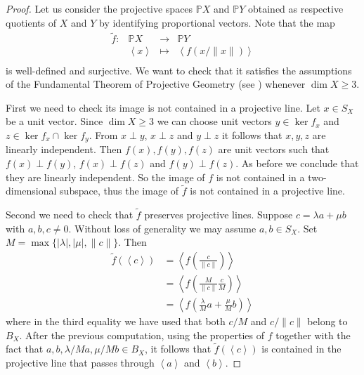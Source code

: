 \documentclass{memo-l}
\theoremstyle{definition}
\theoremstyle{remark}
\numberwithin{section}{chapter}
\numberwithin{equation}{chapter}
\begin{document}
\begin{proof}
    Let us consider the projective spaces $\mathbb{P}X$ and $\mathbb{P}Y$ obtained as respective quotients of $X$ and $Y$ by identifying proportional vectors. Note that the map
    \[
    \begin{array}{cccc}
    \tilde f\colon& \mathbb{P}X & \longrightarrow & \mathbb{P}Y \\
            & \left< x \right> & \longmapsto & \left< f(x/\|x\|) \right> \\
    \end{array}
    \]
    is well-defined and surjective. We want to check that it satisfies
    the assumptions of the Fundamental Theorem of Projective Geometry
    (see \cite[Theorem 2.1]{ilisevic_turnesk2020}) whenever $\dim X\ge 3$.

    First we need to check its image is not contained in a projective
    line. Let $x \in S_X$ be a unit vector. Since $\dim X\ge 3$ we can
    choose unit vectors $y \in \ker f_x$ and $z \in \ker f_x \cap \ker
    f_y$. From $x\perp y$, $x\perp z$ and $y\perp z$ it follows that
    $x,y,z$ are linearly independent. Then $f(x),f(y),f(z)$ are
    unit vectors such that $f(x)\perp f(y)$, $f(x)\perp f(z)$ and
    $f(y)\perp f(z)$. As before we conclude that they are linearly
    independent. So the image of $f$ is not contained in a
    two-dimensional subspace, thus the image of $\tilde f$ is not
    contained in a projective line.

    Second we need to check that $\tilde f$ preserves projective
    lines. Suppose $c=\lambda a+\mu b$ with $a,b,c \neq 0$. Without
    loss of generality we may assume $a,b \in S_X$. Set
    $M=\max\{|\lambda |, |\mu |, \|c\|\}$. Then
    \begin{align*}
        \tilde f(\left< c \right>)&=\left< f(\frac{c}{\|c\|}) \right>\\
                                  &=\left<
                                  f(\frac{M}{\|c\|}\frac{c}{M})
                                  \right>\\
                                  &=\left< f(\frac{\lambda
                                  }{M}a+\frac{\mu }{M}b)\right>
    \end{align*}
    where in the third equality we have used that both $c/M$ and
    $c/\|c\|$ belong to $B_X$. After the previous computation, using
    the properties of $f$ together with the fact that $a,b, \lambda
    /Ma, \mu /Mb \in B_X$, it follows that $\tilde f(\left< c
    \right>)$ is contained in the projective line that passes through
    $\left< a \right>$ and $\left< b \right>$.


\end{proof}
\end{document}
